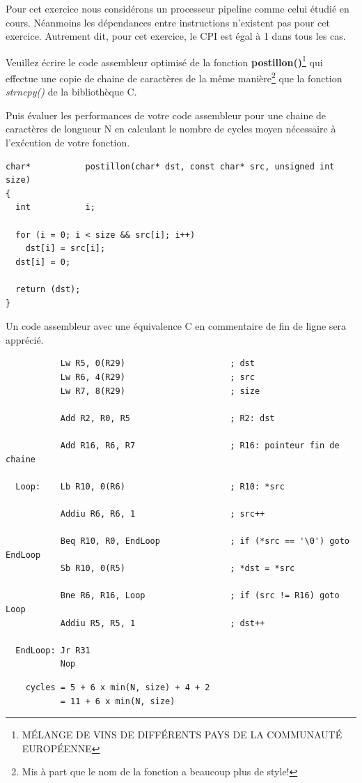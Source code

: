 Pour cet exercice nous consid\'erons un processeur pipeline comme celui
\'etudi\'e en cours. N\'eanmoins les d\'ependances entre instructions
n'existent pas pour cet exercice. Autrement dit, pour cet exercice,
le CPI est \'egal \`a 1 dans tous les cas.

Veuillez \'ecrire le code assembleur optimis\'e de la fonction
\textbf{postillon()}\footnote{M\'ELANGE DE VINS DE DIFF\'ERENTS
                     PAYS DE LA COMMUNAUT\'E EUROP\'EENNE}
qui effectue une copie de chaine de caract\`eres de la m\^eme
mani\`ere\footnote{Mis \`a part que le nom de la fonction a
                   beaucoup plus de style!}
que la fonction \textit{strncpy()} de la biblioth\`eque C.

Puis \'evaluer les performances de votre code assembleur pour une chaine
de caract\`eres de longueur N en calculant le nombre de cycles moyen
n\'ecessaire \`a l'ex\'ecution de votre fonction.

\begin{verbatim}
char*           postillon(char* dst, const char* src, unsigned int size)
{
  int           i;

  for (i = 0; i < size && src[i]; i++)
    dst[i] = src[i];
  dst[i] = 0;

  return (dst);
}
\end{verbatim}

Un code assembleur avec une \'equivalence C en commentaire de fin de ligne
sera appr\'eci\'e.

\begin{correction}

  \begin{verbatim}
           Lw R5, 0(R29)                     ; dst
           Lw R6, 4(R29)                     ; src
           Lw R7, 8(R29)                     ; size

           Add R2, R0, R5                    ; R2: dst

           Add R16, R6, R7                   ; R16: pointeur fin de chaine

  Loop:    Lb R10, 0(R6)                     ; R10: *src

           Addiu R6, R6, 1                   ; src++

           Beq R10, R0, EndLoop              ; if (*src == '\0') goto EndLoop
           Sb R10, 0(R5)                     ; *dst = *src

           Bne R6, R16, Loop                 ; if (src != R16) goto Loop
           Addiu R5, R5, 1                   ; dst++

  EndLoop: Jr R31
           Nop
  \end{verbatim}

  \begin{verbatim}
    cycles = 5 + 6 x min(N, size) + 4 + 2
           = 11 + 6 x min(N, size)
  \end{verbatim}

\end{correction}

